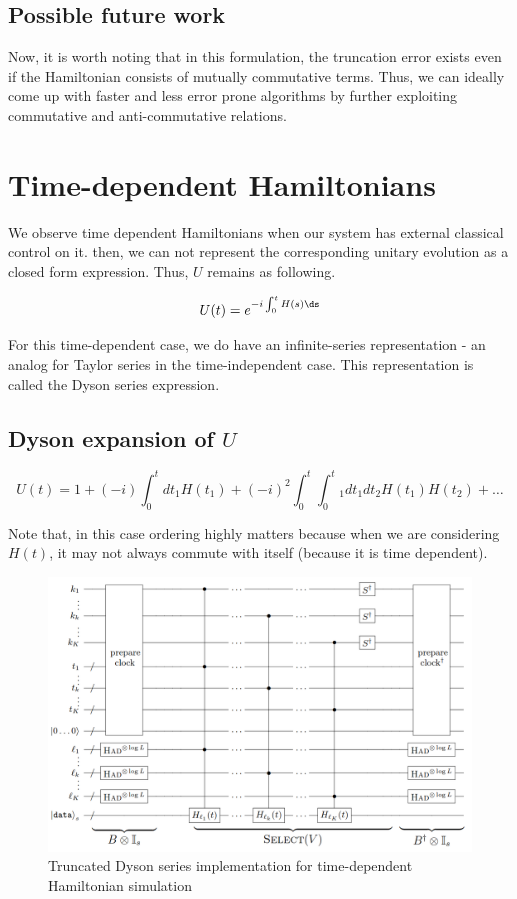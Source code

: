 \documentclass[
10pt, %
a4paper, %
oneside, %
headinclude,footinclude, %
BCOR5mm, %
]{scrartcl}
\begin{document}
\subsection{Possible future work}
Now, it is worth noting that in this formulation, the truncation error exists even if the Hamiltonian consists of mutually commutative terms. Thus, we can ideally come up with faster and less error prone algorithms by further exploiting commutative and anti-commutative relations.

\section{Time-dependent Hamiltonians}
We observe time dependent Hamiltonians when our system has external classical control on it. then, we can not represent the corresponding unitary evolution as a closed form expression. Thus, $U$ remains as following.

$$U(t) = e^{-i \int_0^t H(s) \ds}$$

For this time-dependent case, we do have an infinite-series representation - an analog for Taylor series in the time-independent case. This representation is called the Dyson series expression.

\subsection{Dyson expansion of $U$}
$$U(t) = 1 + (-i) \int_0^t dt_1H(t_1) + (-i)^2 \int_0^t \int_0^t_1 dt_1 dt_2 H(t_1) H(t_2) + \ldots$$

Note that, in this case ordering highly matters because when we are considering $H(t)$, it may not always commute with itself (because it is time dependent).

\begin{figure}[H]
    \centering
    \includegraphics[width=\linewidth]{images/trunc.png}
    \caption{Truncated Dyson series implementation for time-dependent Hamiltonian simulation}
\end{figure}
\end{document}
